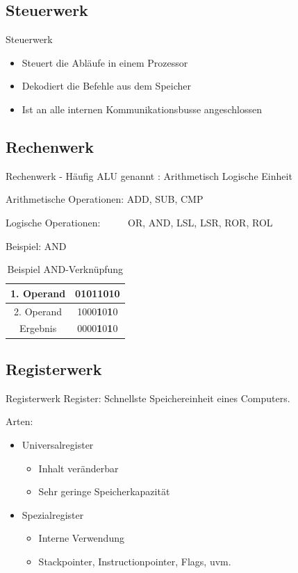 \documentclass{beamer}
\begin{document}
\subsection{Steuerwerk}
\begin{frame}{Steuerwerk}
\begin{itemize}


\item{Steuert die Abl\"aufe in einem Prozessor}
\bigskip
\item{Dekodiert die Befehle aus dem Speicher}
\bigskip
\item{Ist an alle internen Kommunikationsbusse angeschlossen}
\end{itemize}
\end{frame}



\subsection{Rechenwerk}
\begin{frame}[t]{Rechenwerk}
- H\"aufig ALU genannt : Arithmetisch Logische Einheit \par \bigskip
Arithmetische Operationen: ADD, SUB, CMP\newline\par
Logische Operationen: \ \ \ \ \ OR, AND, LSL, LSR, ROR, ROL \par
\pause\bigskip
Beispiel: AND 
\begin{table}[]
\begin{tabular}{|c|c|}
\hline
1. Operand & 0101\textbf{1}0\textbf{1}0 \\ \hline
2. Operand & 1000\textbf{1}0\textbf{1}0 \\ \hline\hline
Ergebnis   & 0000\textbf{1}0\textbf{1}0 \\ \hline
\end{tabular}
\centering
\caption{Beispiel AND-Verkn\"upfung}
\end{table}
\end{frame}


\subsection{Registerwerk}
\begin{frame}[t]{Registerwerk}
Register: Schnellste Speichereinheit eines Computers.
\par\smallskip
Arten:
\begin{itemize}
\item Universalregister
\begin{itemize}
\item Inhalt ver\"anderbar
\item Sehr geringe Speicherkapazit\"at
\smallskip
\end{itemize}
\item Spezialregister
\begin{itemize}
\item Interne Verwendung
\item Stackpointer, Instructionpointer, Flags, uvm.
\end{itemize}
\end{itemize}
\end{frame}
\end{document}
